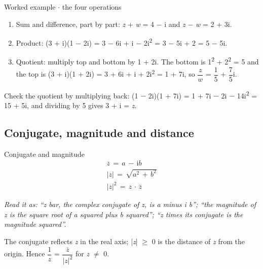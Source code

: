 \documentclass[11pt]{article}
\begin{document}
\begin{keepsection}
\begin{keepsection}
\begin{workedbox}{Worked example \ensuremath{\cdot} the four operations}
\begin{enumerate}
\item Sum and difference, part by part: \textit{z} + \textit{w} = 4 \ensuremath{-} i and \textit{z} \ensuremath{-} \textit{w} = 2 + 3i.
\item Product: (3 + i)(1 \ensuremath{-} 2i) = 3 \ensuremath{-} 6i + i \ensuremath{-} 2i\textsuperscript{2} = 3 \ensuremath{-} 5i + 2 = 5 \ensuremath{-} 5i.
\item Quotient: multiply top and bottom by 1 + 2i. The bottom is 1\textsuperscript{2} + 2\textsuperscript{2} = 5 and the top is (3 + i)(1 + 2i) = 3 + 6i + i + 2i\textsuperscript{2} = 1 + 7i, so {\small\ensuremath{\dfrac{{z}}{{w}}}} = {\small\ensuremath{\dfrac{1}{5}}} + {\small\ensuremath{\dfrac{7}{5}}}i.
\end{enumerate}

Check the quotient by multiplying back: (1 \ensuremath{-} 2i)(1 + 7i) = 1 + 7i \ensuremath{-} 2i \ensuremath{-} 14i\textsuperscript{2} = 15 + 5i, and dividing by 5 gives 3 + i = \textit{z}.
\end{workedbox}
\end{keepsection}

\begin{keepsection}
\subsection{Conjugate, magnitude and distance}

\begin{equationcard}{Conjugate and magnitude}
\[ \begin{gathered} {\overline{z}}\, =\, {a}\, -\, \mathrm{i}{b} \\ |{z}|\, =\, \sqrt{{a}^{2}\, +\, {b}^{2}} \\ |{z}|^{2}\, =\, {z}\, \cdot \, {\overline{z}} \end{gathered} \]
{\small \emph{Read it as: “z bar, the complex conjugate of z, is a minus i b”; “the magnitude of z is the square root of a squared plus b squared”; “z times its conjugate is the magnitude squared”.}\par The conjugate reflects \textit{z} in the real axis; |\textit{z}| \ensuremath{\geq} 0 is the distance of \textit{z} from the origin. Hence {\small\ensuremath{\dfrac{1}{{z}}}} = {\small\ensuremath{\dfrac{{\overline{z}}}{|{z}|^{2}}}} for \textit{z} \ensuremath{\neq} 0.}
\end{equationcard}


\end{keepsection}
\end{keepsection}
\end{document}
